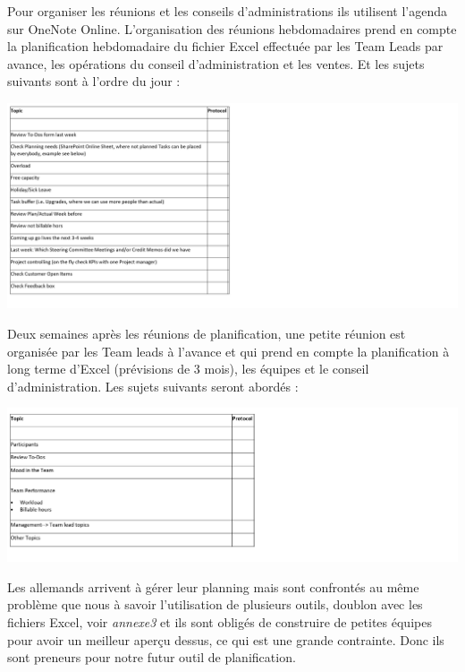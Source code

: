 \documentclass[11pt]{report}
\begin{document}
\hspace{1cm} Pour organiser les réunions et les conseils d’administrations ils utilisent l’agenda sur OneNote Online. L’organisation des réunions hebdomadaires prend en compte la planification hebdomadaire du fichier Excel effectuée par les Team Leads par avance, les opérations du conseil d’administration et les ventes. Et les sujets suivants sont à l’ordre du jour : 
\begin{center}
\includegraphics[scale=1]{images/tab1.png}
\end{center}

\hspace{1cm} Deux semaines après les réunions de planification, une petite réunion est organisée par les Team leads à l’avance et qui prend en compte la planification à long terme d’Excel (prévisions de 3 mois), les équipes et le conseil d’administration.  Les sujets suivants seront abordés :
\begin{center}
\includegraphics[scale=1]{images/tab2.png}
\end{center}

\hspace{1cm} Les allemands arrivent à gérer leur planning mais sont confrontés au même problème que nous à savoir l’utilisation de plusieurs outils, doublon avec les fichiers Excel, voir \textit{annexe3} et ils sont obligés de construire de petites équipes pour avoir un meilleur aperçu dessus, ce qui est une grande contrainte. Donc ils sont preneurs pour notre futur outil de planification.
\end{document}
